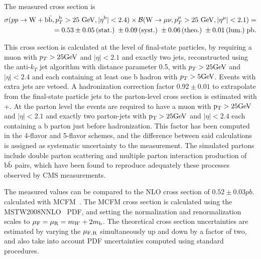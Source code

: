 The measured cross section is
\begin{eqnarray*}
\sigma(pp\rightarrow \mathrm{W} + \bbbar, p_T^{\mathrm{b}}>25~\GeV, |\eta^{\mathrm{b}}|<2.4)\times{\cal{B}}(\Wmn, p_T^{\mu}>25~\GeV, |\eta^\mu|<2.1) = \\
            =0.53\pm  0.05\stat \pm 0.09 \syst \pm 0.06 \theo \pm 0.01\lumi \mathrm{pb.} %
\end{eqnarray*}

This cross section is calculated at the level of final-state particles, by requiring a muon with $p_T>25\mathrm{GeV}$ and $|\eta|<2.1$ and
exactly two jets, reconstructed using the anti-$k_T$ jet algorithm with distance parameter 0.5, with $p_T>25\mathrm{GeV}$ and $|\eta|<2.4$ and
each containing at least one b hadron with $p_T>5\mathrm{GeV}$. Events with extra jets are vetoed.
A hadronization correction factor $0.92\pm0.01$ to extrapolate from the final-state particle jets 
to the parton-level cross section 
is estimated with \MADGRAPH+\PYTHIA. At the parton level the events are required to have a 
muon with
$\mathrm{p_{T}} > 25\mathrm{GeV}$ and $|\eta|<2.1$ and exactly two parton-jets with
$\mathrm{p_{T}} > 25\mathrm{GeV}$ and $|\eta|<2.4$ each containing a b parton just before hadronization. This factor has been computed in the 4-flavor and 5-flavor
schemes, and the difference between said calculations is assigned as systematic uncertainty to the measurement.
The simulated partons include double parton scattering and multiple parton interaction 
production of $\mathrm{b\bar{b}}$ pairs, which have been found to reproduce adequately these 
processes observed by CMS measurements. 

The measured values can be compared to the NLO cross section of
$0.52 \pm 0.03pb.$ 
calculated with MCFM~\cite{Campbell:2010ff, Badger:2010mg}.
The MCFM cross section is calculated using the MSTW2008NNLO~\cite{Martin:2009iq} PDF, and 
setting the normalization and renormalization scales to $\mu_{\rm{F}} = \mu_{\rm{R}} = m_{W} + 2m_{\rm{b}}$.
The theoretical cross section uncertainties
are estimated by varying the $\mu_{\rm{F,R}}$ simultaneously up and down by a factor of two, and also take
into account PDF uncertainties computed using standard procedures.

